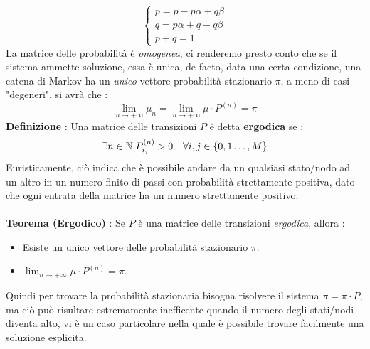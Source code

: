 \documentclass[12pt, letterpaper]{article}
\newcommand{\N}{{\mathbb N}}
\newcommand{\acc}{\\\hphantom{}\\}
\newcommand{\spaz}{{\text{\hphantom{aa}}}}
\begin{document}
$$\begin{cases}
    p=p-p\alpha+q\beta\\ 
    q=p\alpha+q-q\beta\\
    p+q=1
\end{cases}$$
La matrice delle probabilità è \textit{omogenea}, ci renderemo presto conto che se il sistema ammette soluzione, essa 
è unica, de facto, data una certa condizione, una catena di Markov ha un \textit{unico} vettore probabilità 
stazionario \(\pi\), a meno di casi "degeneri", si avrà che :
$$\lim_{n\rightarrow +\infty}\mu_n=\lim_{n\rightarrow +\infty}\mu\cdot P^{(n)}=\pi$$
\textbf{Definizione} : Una matrice delle transizioni \(P\) è detta \textbf{ergodica} se :$$
\exists n\in \N|P^{(n)}_{i_j}>0\spaz\forall i,j\in \{0,1\dots,M\}$$
Euristicamente, ciò indica che è possibile andare da un qualsiasi stato/nodo ad un altro in un numero finito di passi 
con probabilità strettamente positiva, dato che ogni entrata della matrice ha un numero strettamente positivo.\acc 
\textbf{Teorema (Ergodico)} : Se \(P\) è una matrice delle transizioni \textit{ergodica}, allora : \begin{itemize}
    \item Esiste un unico vettore delle probabilità stazionario \(\pi\).
    \item \(\displaystyle\lim_{n\rightarrow +\infty}\mu\cdot P^{(n)}=\pi\).
\end{itemize}
Quindi per trovare la probabilità stazionaria bisogna risolvere il sistema \(\pi=\pi\cdot P\), ma ciò può risultare 
estremamente inefficente quando il numero degli stati/nodi diventa alto, vi è un caso particolare nella quale è 
possibile trovare facilmente una soluzione esplicita.
\end{document}
